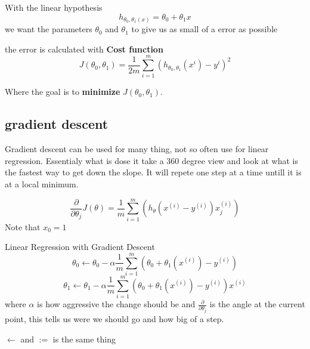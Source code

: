 \begin{multicols}{2}
With the linear hypothesis
\begin{equation*}
    h_{\theta_0,\theta_1(x)} = \theta_0 + \theta_1 x
\end{equation*}
we want the parameters $\theta_0$ and $\theta_1$ to give us as small of a error as possible

the error is calculated with \textbf{Cost function} 
\begin{equation*}
    J(\theta_0,\theta_1) = \frac{1}{2m}\sum_{i=1}^{m}(h_{\theta_0,\theta_1}(x^i)-y^i)^2
\end{equation*}

Where the goal is to \textbf{minimize} $J(\theta_0,\theta_1)$.

\subsection{gradient descent}

Gradient descent can be used for many thing, not so often use for linear regression.
Essentialy what is dose it take a 360 degree view and look at what is the fastest way
to get down the slope. It will repete one step at a time untill it is at a local minimum.

\begin{equation*}
    \frac{\partial}{\partial\theta_j}J(\theta) = \frac{1}{m}\sum_{i=1}^m \left( h_{\theta}(x^{(i)} -y^{(i)})x_j^{(i)} \right)
\end{equation*}
Note that $x_0=1$


\begin{definitionblock}{Linear Regression with Gradient Descent}
    \begin{equation*}
        \theta_0 \gets \theta_0 - \alpha\frac{1}{m}\sum_{i=1}^{m}(\theta_0 + \theta_1(x^{(i)}) - y^{(i)})
    \end{equation*} 
    \begin{equation*}
        \theta_1 \gets \theta_1 - \alpha\frac{1}{m}\sum_{i=1}^{m}(\theta_0 + \theta_1(x^{(i)}) - y^{(i)}) x^{(i)}
    \end{equation*} 
    where $\alpha$ is how aggressive the change should be and $\frac{\partial}{\partial\theta_j}$
    is the angle at the current point, this tells us were we should go and how big of a step.
\end{definitionblock}
$\gets$ and $:=$ is the same thing


\end{multicols}
